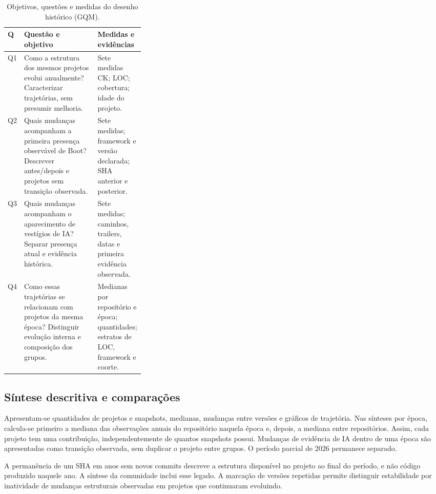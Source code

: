 \begin{table}[H]
\centering\footnotesize
\caption{Objetivos, questões e medidas do desenho histórico (GQM).}
\label{tab:gqm-objetivos}
\begin{tabularx}{\linewidth}{|p{0.05\linewidth}|X|p{0.26\linewidth}|}
\hline
\textbf{Q} & \textbf{Questão e objetivo} & \textbf{Medidas e evidências} \\\hline
Q1 & Como a estrutura dos mesmos projetos evolui anualmente? Caracterizar trajetórias, sem presumir melhoria. & Sete medidas CK; LOC; cobertura; idade do projeto. \\\hline
Q2 & Quais mudanças acompanham a primeira presença observável de Boot? Descrever antes/depois e projetos sem transição observada. & Sete medidas; framework e versão declarada; SHA anterior e posterior. \\\hline
Q3 & Quais mudanças acompanham o aparecimento de vestígios de IA? Separar presença atual e evidência histórica. & Sete medidas; caminhos, trailers, datas e primeira evidência observada. \\\hline
Q4 & Como essas trajetórias se relacionam com projetos da mesma época? Distinguir evolução interna e composição dos grupos. & Medianas por repositório e época; quantidades; estratos de LOC, framework e coorte. \\\hline
\end{tabularx}
\end{table}

\subsection{Síntese descritiva e comparações}
\label{subsec:estatistica}

Apresentam-se quantidades de projetos e snapshots, medianas, mudanças entre versões e gráficos de trajetória. Nas sínteses por época, calcula-se primeiro a mediana das observações anuais do repositório naquela época e, depois, a mediana entre repositórios. Assim, cada projeto tem uma contribuição, independentemente de quantos snapshots possui. Mudanças de evidência de IA dentro de uma época são apresentadas como transição observada, sem duplicar o projeto entre grupos. O período parcial de 2026 permanece separado.

A permanência de um SHA em anos sem novos commits descreve a estrutura disponível no projeto ao final do período, e não código produzido naquele ano. A síntese da comunidade inclui esse legado. A marcação de versões repetidas permite distinguir estabilidade por inatividade de mudanças estruturais observadas em projetos que continuaram evoluindo.

